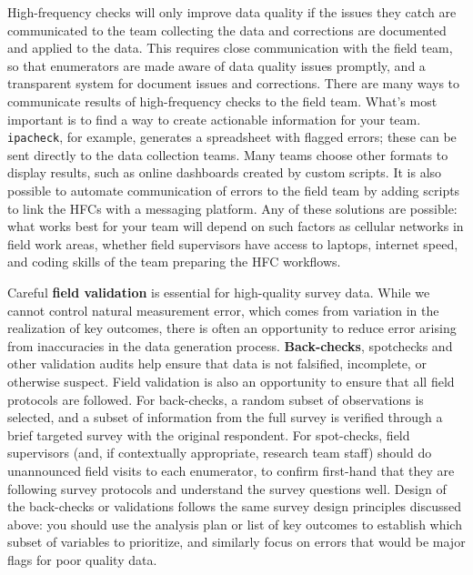 High-frequency checks will only improve data quality
if the issues they catch are communicated to the team collecting the data
and corrections are documented and applied to the data.
This requires close communication with the field team, 
so that enumerators are made aware of data quality issues promptly,
and a transparent system for document issues and corrections. 
There are many ways to communicate results of high-frequency checks to the field team.
What's most important is to find a way to create actionable information for your team.
\texttt{ipacheck},
for example, generates a spreadsheet with flagged errors;
these can be sent directly to the data collection teams.
Many teams choose other formats to display results,
such as online dashboards created by custom scripts.
It is also possible to automate communication of errors to the field team
by adding scripts to link the HFCs with a messaging platform.
Any of these solutions are possible:
what works best for your team will depend on such factors as
cellular networks in field work areas, whether field supervisors have access to laptops,
internet speed, and coding skills of the team preparing the HFC workflows.

Careful \textbf{field validation} is essential for high-quality survey data.
While we cannot control natural measurement error,
which comes from variation in the realization of key outcomes,
there is often an opportunity to reduce error arising from inaccuracies in the data generation process.
\textbf{Back-checks}, spotchecks and other validation audits help ensure that 
data is not falsified, incomplete, or otherwise suspect.
Field validation is also an opportunity to ensure that all field protocols are followed.
For back-checks, a random subset of observations is selected,
and a subset of information from the full survey is
verified through a brief targeted survey with the original respondent.
For spot-checks, field supervisors (and, if contextually appropriate, research team staff)
should do unannounced field visits to each enumerator, 
to confirm first-hand that they are following survey protocols and 
understand the survey questions well. 
Design of the back-checks or validations follows the same survey design
principles discussed above: you should use the analysis plan
or list of key outcomes to establish which subset of variables to prioritize,
and similarly focus on errors that would be major flags for poor quality data.


